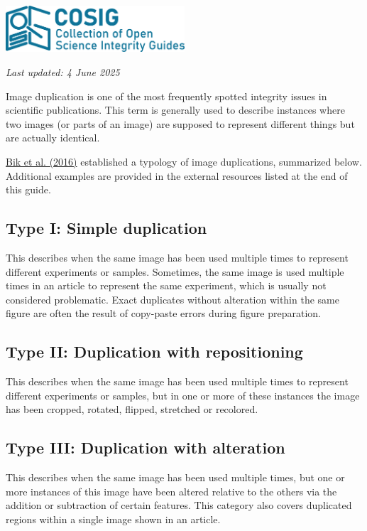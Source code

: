 \documentclass[letterpaper, 12pt]{article}
\begin{document}
\flushleft\includegraphics[width=0.5\textwidth]{img/home/241017_final_logo_mockup.png}

\textit{Last updated: 4 June 2025}

Image duplication is one of the most frequently spotted integrity issues in scientific publications. This term is generally used to describe instances where two images (or parts of an image) are supposed to represent different things but are actually identical.

\href{https://doi.org/10.1128/mbio.00809-16}{Bik et al. (2016)} established a typology of image duplications, summarized below. Additional examples are provided in the external resources listed at the end of this guide.

\subsection*{Type I: Simple duplication}

This describes when the same image has been used multiple times to represent different experiments or samples. Sometimes, the same image is used multiple times in an article to represent the same experiment, which is usually not considered problematic. Exact duplicates without alteration within the same figure are often the result of copy-paste errors during figure preparation.

\subsection*{Type II: Duplication with repositioning}

This describes when the same image has been used multiple times to represent different experiments or samples, but in one or more of these instances the image has been cropped, rotated, flipped, stretched or recolored.

\subsection*{Type III: Duplication with alteration} 

This describes when the same image has been used multiple times, but one or more instances of this image have been altered relative to the others via the addition or subtraction of certain features. This category also covers duplicated regions within a single image shown in 
an article.
\end{document}

